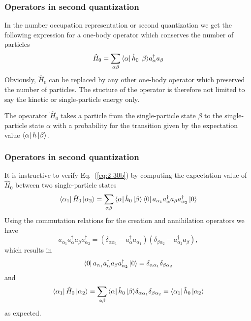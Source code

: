 \frame
{
  \frametitle{Operators in second quantization}
\begin{small}
{\scriptsize
In the number occupation representation or second quantization we get the following expression for a one-body 
operator which conserves the number of particles
\begin{equation}
	\hat{H}_0 = \sum_{\alpha\beta} \element{\alpha}{\hat{h}_0}{\beta} a_\alpha^\dagger a_\beta \label{eq:2-30b}
\end{equation}
Obviously, $\hat{H}_0$ can be replaced by any other one-body  operator which preserved the number
of particles. The stucture of the operator is therefore not limited to say the kinetic or single-particle energy only.

The opearator $\hat{H}_0$ takes a particle from the single-particle state $\beta$  to the single-particle state $\alpha$ 
with a probability for the transition given by the expectation value $\bra{\alpha}h\,|{\beta}\rangle$.
}
\end{small}
}

\frame
{
  \frametitle{Operators in second quantization}
\begin{small}
{\scriptsize
It is instructive to verify Eq.~(\ref{eq:2-30b}) by computing the expectation value of $\hat{H}_0$ 
between two single-particle states
\begin{equation}
	\element{\alpha_1}{\hat{H}_0}{\alpha_2} = \sum_{\alpha\beta} \element{\alpha}{\hat{h}_0}{\beta} 
		\element{0}{a_{\alpha_1}a_\alpha^\dagger a_\beta a_{\alpha_2}^\dagger}{0} \label{eq:2-30c}
\end{equation}
Using the commutation relations for the creation and annihilation operators we have 
\begin{equation}
	a_{\alpha_1}a_\alpha^\dagger a_\beta a_{\alpha_2}^\dagger = (\delta_{\alpha \alpha_1} - a_\alpha^\dagger a_{\alpha_1} )
		(\delta_{\beta \alpha_2} - a_{\alpha_2}^\dagger a_{\beta} ), \label{eq:2-30d}
\end{equation}
which results in
\begin{equation}
	\element{0}{a_{\alpha_1}a_\alpha^\dagger a_\beta a_{\alpha_2}^\dagger}{0} = 
		\delta_{\alpha \alpha_1} \delta_{\beta \alpha_2} \label{eq:2-30e}
\end{equation}
and
\begin{equation}
	\element{\alpha_1}{\hat{H}_0}{\alpha_2} = \sum_{\alpha\beta} \element{\alpha}{\hat{h}_0}{\beta} 
		\delta_{\alpha \alpha_1} \delta_{\beta \alpha_2} = \element{\alpha_1}{\hat{h}_0}{\alpha_2} \label{eq:2-30f}
\end{equation}
as expected.
}
\end{small}
}


